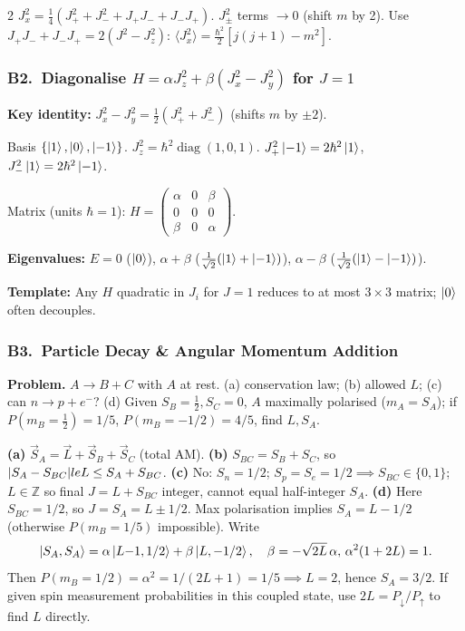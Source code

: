 \documentclass[9pt,a4paper]{article} %
\newcommand{\diag}{\operatorname{diag}}
\begin{document}
\begin{multicols}{2}
$J_x^2=\frac{1}{4}(J_+^2+J_-^2+J_+J_-+J_-J_+)$. $J_\pm^2$ terms $\to 0$ (shift $m$ by 2).
Use $J_+J_-+J_-J_+=2(J^2-J_z^2)$:
$\boxed{\langle J_x^2\rangle=\frac{\hbar^2}{2}[j(j+1)-m^2]}$.

\subsubsection{B2.\ Diagonalise $H=\alpha J_z^2+\beta(J_x^2-J_y^2)$ for $J=1$}
\textbf{Key identity:} $J_x^2-J_y^2=\frac{1}{2}(J_+^2+J_-^2)$ (shifts $m$ by $\pm 2$).

Basis $\{\ket{1},\ket{0},\ket{-1}\}$. $J_z^2=\hbar^2\diag(1,0,1)$.
$J_+^2\ket{-1}=2\hbar^2\ket{1}$, $J_-^2\ket{1}=2\hbar^2\ket{-1}$.

Matrix (units $\hbar=1$):
$H=\begin{pmatrix}\alpha&0&\beta\\0&0&0\\\beta&0&\alpha\end{pmatrix}$.

\textbf{Eigenvalues:} $E=0$\; ($\ket{0}$),\; $\alpha+\beta$\; ($\frac{1}{\sqrt{2}}(\ket{1}+\ket{-1})$),\; $\alpha-\beta$\; ($\frac{1}{\sqrt{2}}(\ket{1}-\ket{-1})$).

\textbf{Template:} Any $H$ quadratic in $J_i$ for $J=1$ reduces to at most $3\times 3$ matrix; $\ket{0}$ often decouples.

\subsubsection{B3.\ Particle Decay \& Angular Momentum Addition}
\textbf{Problem.} $A\to B+C$ with $A$ at rest. (a) conservation law; (b) allowed $L$; (c) can $n\to p+e^-$? 
(d) Given $S_B=\frac12,S_C=0$, $A$ maximally polarised ($m_A=S_A$); if $P(m_B=\frac12)=1/5$, $P(m_B=-1/2)=4/5$, find $L,S_A$.

\textbf{(a)} $\vec S_A=\vec L+\vec S_B+\vec S_C$ (total AM). 
\textbf{(b)} $S_{BC}=S_B+S_C$, so $|S_A-S_{BC}|\\le L\le S_A+S_{BC}$.  
\textbf{(c)} No: $S_n=1/2$; $S_p=S_e=1/2\implies S_{BC}\in\{0,1\}$; $L\in\mathbb Z$ so final $J=L+S_{BC}$ integer, cannot equal half-integer $S_A$. 
\textbf{(d)} Here $S_{BC}=1/2$, so $J=S_A= L\pm1/2$. Max polarisation implies $S_A=L-1/2$ (otherwise $P(m_B=1/5)$ impossible). Write
\[\ket{S_A,S_A}=\alpha\ket{L{-}1,1/2}+\beta\ket{L,-1/2},
\quad\beta=-\sqrt{2L}\,\alpha,\,\alpha^2(1+2L)=1.\] 
Then $P(m_B=1/2)=\alpha^2=1/(2L+1)=1/5\implies L=2$, hence $S_A=3/2$.
{\scriptsize If given spin measurement probabilities in this coupled state, use $2L = P_{\downarrow}/P_{\uparrow}$ to find $L$ directly.}


\end{multicols}
\end{document}
